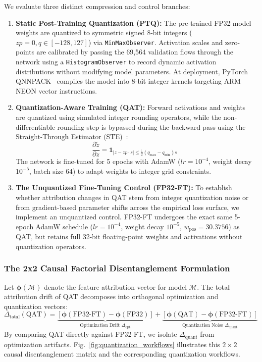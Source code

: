\documentclass[conference]{IEEEtran}
\begin{document}
We evaluate three distinct compression and control branches:
\begin{enumerate}
    \item \textbf{Static Post-Training Quantization (PTQ):} The pre-trained FP32 model weights are quantized to symmetric signed 8-bit integers ($zp = 0, q \in [-128, 127]$) via \texttt{MinMaxObserver}. Activation scales and zero-points are calibrated by passing the 69,564 validation flows through the network using a \texttt{HistogramObserver} to record dynamic activation distributions without modifying model parameters. At deployment, PyTorch QNNPACK~\cite{b21} compiles the model into 8-bit integer kernels targeting ARM NEON vector instructions.
    \item \textbf{Quantization-Aware Training (QAT):} Forward activations and weights are quantized using simulated integer rounding operators, while the non-differentiable rounding step is bypassed during the backward pass using the Straight-Through Estimator (STE)~\cite{b22}:
    \begin{equation}
    \frac{\partial \tilde{z}}{\partial z} = \mathbf{1}_{|z - zp \cdot s| \le \frac{1}{2}(q_{\max} - q_{\min}) s}
    \label{eq:ste}
    \end{equation}
    The network is fine-tuned for 5 epochs with AdamW ($lr = 10^{-4}$, weight decay $10^{-5}$, batch size 64) to adapt weights to integer grid constraints.
    \item \textbf{The Unquantized Fine-Tuning Control (FP32-FT):} To establish whether attribution changes in QAT stem from integer quantization noise or from gradient-based parameter shifts across the empirical loss surface, we implement an unquantized control. FP32-FT undergoes the exact same 5-epoch AdamW schedule ($lr = 10^{-4}$, weight decay $10^{-5}$, $w_{\text{pos}} = 30.3756$) as QAT, but retains full 32-bit floating-point weights and activations without quantization operators.
\end{enumerate}

\subsubsection{The 2x2 Causal Factorial Disentanglement Formulation}
Let $\boldsymbol{\phi}(\mathcal{M})$ denote the feature attribution vector for model $\mathcal{M}$. The total attribution drift of QAT decomposes into orthogonal optimization and quantization vectors:
\begin{equation}
\Delta_{\text{total}}(\text{QAT}) = \underbrace{[\boldsymbol{\phi}(\text{FP32-FT}) - \boldsymbol{\phi}(\text{FP32})]}_{\text{Optimization Drift } \Delta_{\text{opt}}} + \underbrace{[\boldsymbol{\phi}(\text{QAT}) - \boldsymbol{\phi}(\text{FP32-FT})]}_{\text{Quantization Noise } \Delta_{\text{quant}}}
\label{eq:causal_decomp}
\end{equation}
By comparing QAT directly against FP32-FT, we isolate $\Delta_{\text{quant}}$ from optimization artifacts. Fig.~\ref{fig:quantization_workflows} illustrates this $2 \times 2$ causal disentanglement matrix and the corresponding quantization workflows.
\end{document}
